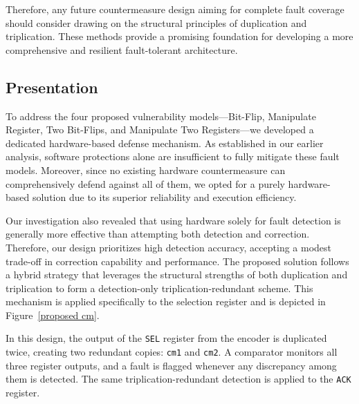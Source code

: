 Therefore, any future countermeasure design aiming for complete fault coverage should consider drawing on the structural principles of duplication and triplication. These methods provide a promising foundation for developing a more comprehensive and resilient fault-tolerant architecture.
\subsection{Presentation}

To address the four proposed vulnerability models—Bit-Flip, Manipulate Register, Two Bit-Flips, and Manipulate Two Registers—we developed a dedicated hardware-based defense mechanism. As established in our earlier analysis, software protections alone are insufficient to fully mitigate these fault models. Moreover, since no existing hardware countermeasure can comprehensively defend against all of them, we opted for a purely hardware-based solution due to its superior reliability and execution efficiency.

Our investigation also revealed that using hardware solely for fault detection is generally more effective than attempting both detection and correction. Therefore, our design prioritizes high detection accuracy, accepting a modest trade-off in correction capability and performance. The proposed solution follows a hybrid strategy that leverages the structural strengths of both duplication and triplication to form a detection-only triplication-redundant scheme. This mechanism is applied specifically to the selection register and is depicted in Figure~\ref{proposed cm}.

In this design, the output of the \texttt{SEL} register from the encoder is duplicated twice, creating two redundant copies: \texttt{cm1} and \texttt{cm2}. A comparator monitors all three register outputs, and a fault is flagged whenever any discrepancy among them is detected. The same triplication-redundant detection is applied to the \texttt{ACK} register.

